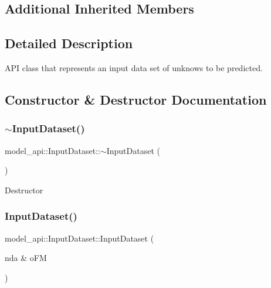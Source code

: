 \subsection*{Additional Inherited Members}


\subsection{Detailed Description}
A\+PI class that represents an input data set of unknows to be predicted. 

\subsection{Constructor \& Destructor Documentation}
\mbox{\label{classmodel__api_1_1InputDataset_a31f12b83db2195f609dfc8af27cdbc58}} 
\subsubsection{\texorpdfstring{$\sim$\+Input\+Dataset()}{~InputDataset()}}
{\footnotesize\ttfamily model\+\_\+api\+::\+Input\+Dataset\+::$\sim$\+Input\+Dataset (\begin{DoxyParamCaption}{ }\end{DoxyParamCaption})}

Destructor \mbox{\label{classmodel__api_1_1InputDataset_a5fd9fc18bbd147d612acb16a808a135c}} 
\subsubsection{\texorpdfstring{Input\+Dataset()}{InputDataset()}\hspace{0.1cm}{\footnotesize\ttfamily [1/2]}}
{\footnotesize\ttfamily model\+\_\+api\+::\+Input\+Dataset\+::\+Input\+Dataset (\begin{DoxyParamCaption}\item[{nda \&}]{o\+FM }\end{DoxyParamCaption})}


